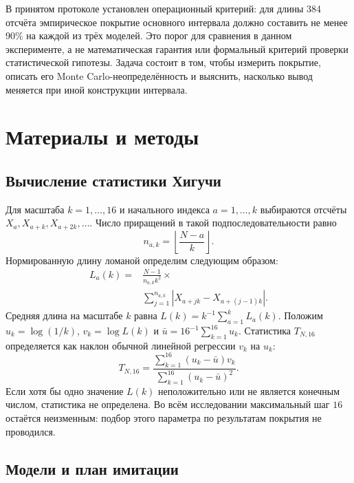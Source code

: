 В принятом протоколе установлен операционный критерий: для длины 384 отсчёта эмпирическое покрытие основного интервала должно составить не менее 90\% на каждой из трёх моделей. Это порог для сравнения в данном эксперименте, а не математическая гарантия или формальный критерий проверки статистической гипотезы. Задача состоит в том, чтобы измерить покрытие, описать его Monte Carlo-неопределённость и выяснить, насколько вывод меняется при иной конструкции интервала.

\section{Материалы и методы}
\subsection{Вычисление статистики Хигучи}

Для масштаба $k=1,\ldots,16$ и начального индекса $a=1,\ldots,k$ выбираются отсчёты $X_a,X_{a+k},X_{a+2k},\ldots$. Число приращений в такой подпоследовательности равно
\begin{equation}
 n_{a,k}=\left\lfloor\frac{N-a}{k}\right\rfloor.
\end{equation}
Нормированную длину ломаной определим следующим образом:
\begin{equation}\label{eq:La}
\begin{split}
 L_a(k)={}&\frac{N-1}{n_{a,k}k^2}\times\\[-2pt]
 &\sum_{j=1}^{n_{a,k}}|X_{a+jk}-X_{a+(j-1)k}|.
\end{split}
\end{equation}
Средняя длина на масштабе $k$ равна $L(k)=k^{-1}\sum_{a=1}^k L_a(k)$. Положим $u_k=\log(1/k)$, $v_k=\log L(k)$ и $\bar u=16^{-1}\sum_{k=1}^{16}u_k$. Статистика $T_{N,16}$ определяется как наклон обычной линейной регрессии $v_k$ на $u_k$:
\begin{equation}\label{eq:hfd}
 T_{N,16}=\frac{\sum_{k=1}^{16}(u_k-\bar u)v_k}
 {\sum_{k=1}^{16}(u_k-\bar u)^2}.
\end{equation}
Если хотя бы одно значение $L(k)$ неположительно или не является конечным числом, статистика не определена. Во всём исследовании максимальный шаг $16$ остаётся неизменным: подбор этого параметра по результатам покрытия не проводился.

\subsection{Модели и план имитации}


